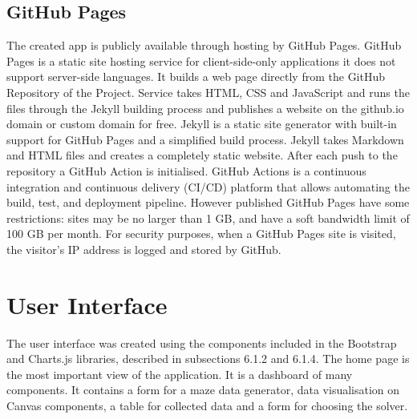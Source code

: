 \subsection{GitHub Pages}
The created app is publicly available through hosting by GitHub Pages. GitHub Pages is a static site hosting service for client-side-only applications it does not support
server-side languages. It builds a web page directly from the GitHub Repository of the Project. Service takes HTML, CSS and JavaScript and runs the files through
the Jekyll building process and publishes a website on the github.io domain or custom domain for free. Jekyll is a static site generator with built-in support for 
GitHub Pages and a simplified build process. Jekyll takes Markdown and HTML files and creates a completely static website. After each push to the repository a GitHub
Action is initialised. GitHub Actions is a continuous integration and continuous delivery (CI/CD) platform that allows automating the build, test, and deployment
pipeline. However published GitHub Pages have some restrictions: sites may be no larger than 1 GB, and have a soft bandwidth limit of 100 GB per month. For security purposes, 
when a GitHub Pages site is visited, the visitor's IP address is logged and stored by GitHub.\\  
\section{User Interface}
The user interface was created using the components included in the Bootstrap and Charts.js libraries, described in subsections 6.1.2 and 6.1.4.
The home page is the most important view of the application. It is a dashboard of many components. It contains a form for a maze data generator, data visualisation
on Canvas components, a table for collected data and a form for choosing the solver.\\
